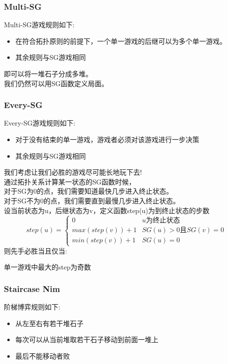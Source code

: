 \documentclass{article}
\begin{document}
\subsubsection{Multi-SG}

Multi-SG游戏规则如下:
\begin{itemize}
\item 在符合拓扑原则的前提下，一个单一游戏的后继可以为多个单一游戏。
\item 其余规则与SG游戏相同
\end{itemize}

即可以将一堆石子分成多堆。\\
我们仍然可以用SG函数定义局面。

\subsubsection{Every-SG}

Every-SG游戏规则如下:
\begin{itemize}
\item 对于没有结束的单一游戏，游戏者必须对该游戏进行一步决策
\item 其余规则与SG游戏相同
\end{itemize}

我们考虑让我们必胜的游戏尽可能长地玩下去!	\\
通过拓扑关系计算某一状态的SG函数时候，	\\
对于SG为0的点，我们需要知道最快几步进入终止状态。	\\
对于SG不为0的点，我们需要直到最慢几步进入终止状态。	\\
设当前状态为u，后继状态为v，定义函数step(u)为到终止状态的步数		\\
$$
step(u) = \begin{cases}
0              & u \text{为终止状态} \\
max(step(v))+1 & SG(u)>0 \text{且} SG(v)=0 \\
min(step(v))+1 & SG(u)=0
\end{cases}
$$
则先手必胜当且仅当:

单一游戏中最大的step为奇数

\subsubsection{Staircase Nim}

阶梯博弈规则如下:
\begin{itemize}
\item 从左至右有若干堆石子
\item 每次可以从当前堆取若干石子移动到前面一堆上
\item 最后不能移动者败
\end{itemize}
\end{document}
